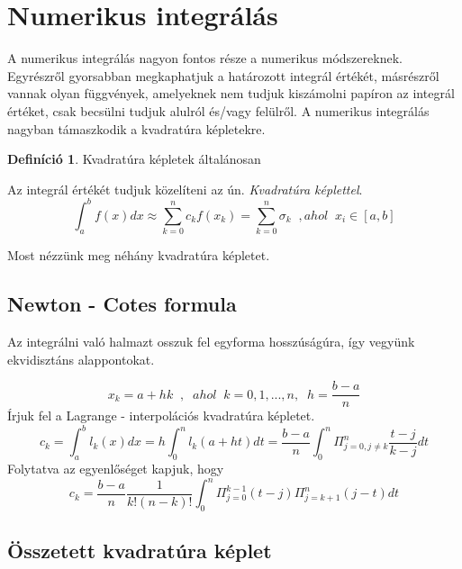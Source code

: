 \documentclass{article}
\theoremstyle{definition}
\theoremstyle{theorem}
\newtheorem{definition}{Definíció}
\begin{document}
\section{Numerikus integrálás}
A numerikus integrálás nagyon fontos része a numerikus módszereknek. Egyrészről gyorsabban megkaphatjuk a határozott  integrál értékét, másrészről vannak olyan függvények, amelyeknek nem tudjuk kiszámolni papíron az integrál értéket, csak becsülni tudjuk alulról és/vagy felülről. A numerikus integrálás nagyban támaszkodik a kvadratúra képletekre.
\begin{definition}
Kvadratúra képletek általánosan

Az integrál értékét tudjuk közelíteni az ún. \textit{Kvadratúra képlettel}.\newline
\begin{equation*}
    \int_{a}^{b} f(x) dx \approx \sum_{k = 0}^{n} c_k f(x_k) = \sum_{k=0}^n \sigma_k \;\; , ahol\;\; x_i \in [a,b]
\end{equation*}

\end{definition}

Most nézzünk meg néhány kvadratúra képletet.
\subsection{Newton - Cotes formula}


Az integrálni való halmazt osszuk fel egyforma hosszúságúra, így vegyünk ekvidisztáns alappontokat.

\begin{equation*}
    x_k = a + hk \;\;, \;\;ahol \;\;k=0,1,...,n ,\;\; h = \frac{b-a}{n}
\end{equation*}
Írjuk fel a Lagrange - interpolációs kvadratúra képletet.
\newline
\begin{equation*}
    c_k = \int_a^{b} l_k(x) dx = h \int_0^{n} l_k (a+ht) dt = \frac{b-a}{n} \int_0 ^{n} \Pi_{j=0, j \neq k}^n \frac{t-j}{k-j} dt
\end{equation*}
Folytatva az egyenlőséget kapjuk, hogy
\begin{equation*}
   c_k =  \frac{b-a}{n} \frac{1}{k! (n-k)!} \int_0^n \Pi_{j=0}^{k-1} (t-j) \Pi_{j=k+1}^{n} (j-t) dt
\end{equation*}
\subsection{Összetett kvadratúra képlet}
\end{document}
